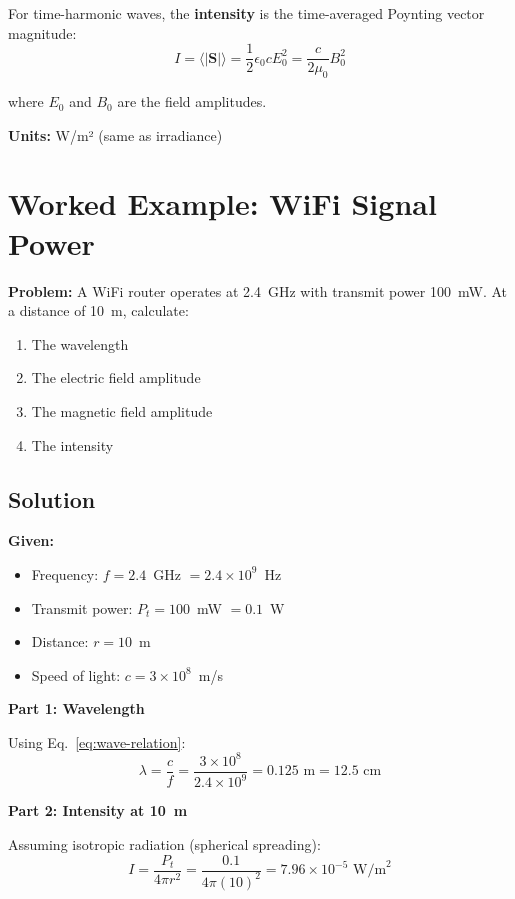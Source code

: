 For time-harmonic waves, the \textbf{intensity} is the time-averaged Poynting vector magnitude:
\begin{equation}
I = \langle |\mathbf{S}| \rangle = \frac{1}{2} \epsilon_0 c E_0^2 = \frac{c}{2\mu_0} B_0^2
\label{eq:intensity}
\end{equation}

where $E_0$ and $B_0$ are the field amplitudes.

\textbf{Units:} W/m² (same as irradiance)

\section{Worked Example: WiFi Signal Power}

\textbf{Problem:} A WiFi router operates at 2.4~GHz with transmit power 100~mW. At a distance of 10~m, calculate:
\begin{enumerate}
\item The wavelength
\item The electric field amplitude
\item The magnetic field amplitude
\item The intensity
\end{enumerate}

\subsection*{Solution}

\textbf{Given:}
\begin{itemize}
\item Frequency: $f = 2.4$~GHz $= 2.4 \times 10^9$~Hz
\item Transmit power: $P_t = 100$~mW $= 0.1$~W
\item Distance: $r = 10$~m
\item Speed of light: $c = 3 \times 10^8$~m/s
\end{itemize}

\textbf{Part 1: Wavelength}

Using Eq.~\ref{eq:wave-relation}:
\begin{equation}
\lambda = \frac{c}{f} = \frac{3 \times 10^8}{2.4 \times 10^9} = 0.125 \text{ m} = 12.5 \text{ cm}
\end{equation}

\textbf{Part 2: Intensity at 10~m}

Assuming isotropic radiation (spherical spreading):
\begin{equation}
I = \frac{P_t}{4\pi r^2} = \frac{0.1}{4\pi (10)^2} = 7.96 \times 10^{-5} \text{ W/m}^2
\end{equation}

